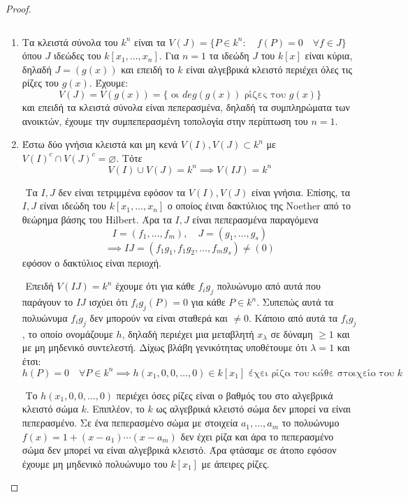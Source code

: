 \documentclass[oneside,a4paper]{article}
\newcommand {\tl}{\textlatin}
\begin{document}
\begin{proof} $ $

	$ $\newline
	\begin{enumerate}
		\item Τα κλειστά σύνολα του $k^n$ είναι τα $V(J) = \{P \in k^n: \quad f(P) = 0 \quad \forall f \in J\}$ όπου $J$ ιδεώδες του $k[x_1,\ldots,x_n]$. Για $n = 1$ τα ιδεώδη $J$ του $k[x]$ είναι κύρια, δηλαδή $J = (g(x))$ και επειδή το $k$ είναι αλγεβρικά κλειστό περιέχει όλες τις ρίζες του $g(x)$. Έχουμε:
		$$V(J) = V(g(x)) = \{\text{ οι } deg(g(x)) \text{ ρίζες του } g(x)\}$$
		και επειδή τα κλειστά σύνολα είναι πεπερασμένα, δηλαδή τα συμπληρώματα των ανοικτών, έχουμε την συμπεπερασμένη τοπολογία στην περίπτωση του $n=1$.

		\item Έστω δύο γνήσια κλειστά και μη κενά $V(I),V(J) \subset k^n$ με $V(I)^c \cap V(J)^c = \varnothing$. Τότε 
		$$V(I) \cup V(J) = k^n \implies V(IJ) = k^n$$
		
		$ $\newline
		Τα $I,J$ δεν είναι τετριμμένα εφόσον τα $V(I),V(J)$ είναι γνήσια. Επίσης, τα $I,J$ είναι ιδεώδη του $k[x_1,\ldots,x_n]$ ο οποίος έιναι δακτύλιος της \tl{Noether} από το θεώρημα βάσης του \tl{Hilbert}. Άρα τα $I,J$ είναι πεπερασμένα παραγόμενα
		$$I = (f_1,\ldots,f_m), \quad J = (g_1, \ldots, g_s)$$
		$$\implies IJ = (f_1 g_1, f_1 g_2, \ldots , f_m g_s) \neq (0)$$
		εφόσον ο δακτύλιος είναι περιοχή.

		$ $\newline
		Επειδή $V(IJ) = k^n$ έχουμε ότι για κάθε $f_i g_j$ πολυώνυμο από αυτά που παράγουν το $IJ$ ισχύει ότι $f_i g_j (P) = 0$ για κάθε $P \in k^n$. Συπεπώς αυτά τα πολυώνυμα $f_i g_j$ δεν μπορούν να είναι σταθερά και $\neq 0$. Κάποιο από αυτά τα $f_i g_j$, το οποίο ονομάζουμε $h$, δηλαδή περιέχει μια μεταβλητή $x_{\lambda}$ σε δύναμη $\geq 1$ και με μη μηδενικό συντελεστή. Δίχως βλάβη γενικότητας υποθέτουμε ότι $\lambda = 1$ και έτσι:
		$$h(P)= 0 \quad \forall P \in k^n \implies h(x_1,0,0,\ldots,0) \in k[x_1] \text{ έχει ρίζα του κάθε στοιχείο του } k$$

		$ $\newline 
		Το $h(x_1,0,0,\ldots, 0)$ περιέχει όσες ρίζες είναι ο βαθμός του στο αλγεβρικά κλειστό σώμα $k$. Επιπλέον, το $k$ ως αλγεβρικά κλειστό σώμα δεν μπορεί να είναι πεπερασμένο. Σε ένα πεπερασμένο σώμα με στοιχεία $a_1,\ldots,a_m$ το πολυώνυμο $f(x) = 1 + (x-a_1)\cdots (x-a_m)$ δεν έχει ρίζα και άρα το πεπερασμένο σώμα δεν μπορεί να είναι αλγεβρικά κλειστό. Άρα φτάσαμε σε άτοπο εφόσον έχουμε μη μηδενικό πολυώνυμο του $k[x_1]$ με άπειρες ρίζες.


\end{enumerate}
\end{proof}
\end{document}
